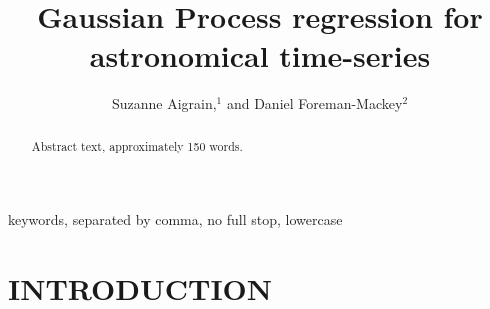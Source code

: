 \documentclass[letterpaper]{ar-1col}
\begin{document}

\title{Gaussian Process regression for astronomical time-series}

\author{Suzanne Aigrain,$^1$ and Daniel Foreman-Mackey$^2$
  }

\begin{abstract}
  Abstract text, approximately 150 words.
\end{abstract}

\begin{keywords}
  keywords, separated by comma, no full stop, lowercase
\end{keywords}
\maketitle

\tableofcontents

\section{INTRODUCTION}
\label{sec:intro}

\begin{armarginnote}[]
\end{armarginnote}
\end{document}
